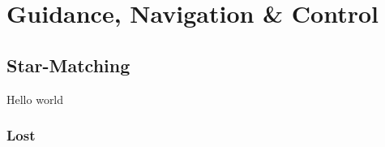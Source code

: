 \chapter{Guidance, Navigation \& Control}
\thispagestyle{fancy}

\section{Star-Matching}
\blindtext


Hello world

\subsection{Lost}


